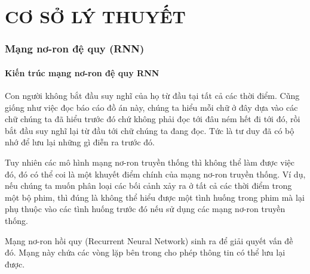 \chapter{CƠ SỞ LÝ THUYẾT}
\subsection{Mạng nơ-ron đệ quy (RNN)}
\subsubsection{Kiến trúc mạng nơ-ron đệ quy RNN}
Con người không bắt đầu suy nghĩ của họ từ đầu tại tất cả các thời điểm. Cũng giống như việc đọc báo cáo đồ án này, chúng ta hiểu mỗi chữ ở đây dựa vào các chữ chúng ta đã hiểu trước đó chứ không phải đọc tới đâu ném hết đi tới đó, rồi bắt đầu suy nghĩ lại từ đầu tới chữ chúng ta đang đọc. Tức là tư duy đã có bộ nhớ để lưu lại những gì điễn ra trước đó.\par
Tuy nhiên các mô hình mạng nơ-ron truyền thống thì không thể làm được việc đó, đó có thể coi là một khuyết điểm chính của mạng nơ-ron truyền thống. Ví dụ, nếu chúng ta muốn phân loại các bối cảnh xảy ra ở tất cả các thời điểm trong một bộ phim, thì đúng là không thể hiểu được một tình huống trong phim mà lại phụ thuộc vào các tình huống trước đó nếu sử dụng các mạng nơ-ron truyền thống.\par
Mạng nơ-ron hồi quy (Recurrent Neural Network) sinh ra để giải quyết vấn đề đó. Mạng này chứa các vòng lặp bên trong cho phép thông tin có thể lưu lại được.\par
